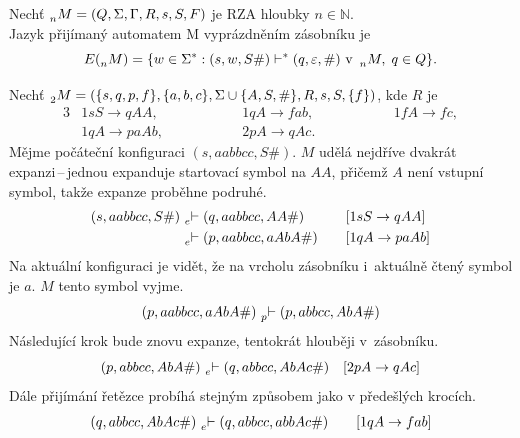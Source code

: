 \begin{definition}\label{def_jazyk_rza_empty}
    Nechť $\prescript{}{n}{M} = (Q, \Sigma, \Gamma, R, s, S, F)$ je RZA hloubky $n \in \mathbb{N}$. \\
    Jazyk přijímaný automatem M vyprázdněním zásobníku je
    \begin{equation*}
        E(\prescript{}{n}{M}) = \{w \in \Sigma^* : (s, w, S\#) \vdash^* (q, \varepsilon, \#) \text{ v~}\prescript{}{n}{M},\; q \in Q\}.
    \end{equation*}
\end{definition}

\begin{example}\label{example_rza}
    Nechť $\prescript{}{2}{M} = (\{s, q, p, f\}, \{a, b, c\}, \Sigma \cup \{A, S, \#\}, R, s, S, \{f\})$, kde $R$ je
    \begin{alignat*}{3}
        & 1sS \rightarrow qAA, \qquad \qquad && 1qA \rightarrow fab, \qquad \qquad && 1fA \rightarrow fc, \\
        & 1qA \rightarrow paAb, \qquad \qquad && 2pA \rightarrow qAc. \qquad \qquad &&
    \end{alignat*}
    Mějme počáteční konfiguraci $(s, aabbcc, S\#)$.
    $M$ udělá nejdříve dvakrát expanzi\,--\,jednou expanduje startovací symbol na $AA$, přičemž $A$ není vstupní symbol, takže expanze proběhne podruhé.
    \begin{alignat*}{2}
        (s, aabbcc, S\#)\, &\prescript{}{e}{\vdash}\; (q, aabbcc, AA\#) \quad && [1sS \rightarrow qAA] \\
                           &\prescript{}{e}{\vdash}\; (p, aabbcc, aAbA\#) \quad && [1qA \rightarrow paAb] \\
    \end{alignat*}
    Na aktuální konfiguraci je vidět, že na vrcholu zásobníku i~aktuálně čtený symbol je $a$.
    $M$ tento symbol vyjme.
    \begin{equation*}
        (p, aabbcc, aAbA\#)\, \prescript{}{p}{\vdash}\; (p, abbcc, AbA\#)
    \end{equation*}
    Následující krok bude znovu expanze, tentokrát hlouběji v~zásobníku.
    \begin{equation*}
        (p, abbcc, AbA\#)\, \prescript{}{e}{\vdash}\; (q, abbcc, AbAc\#) \quad [2pA \rightarrow qAc]
    \end{equation*}
    Dále přijímání řetězce probíhá stejným způsobem jako v předešlých krocích.
    \begin{alignat*}{2}
        (q, abbcc, AbAc\#)\, &\prescript{}{e}{\vdash}\; (q, abbcc, abbAc\#) \quad && [1qA \rightarrow fab] \\

\end{alignat*}
\end{example}
